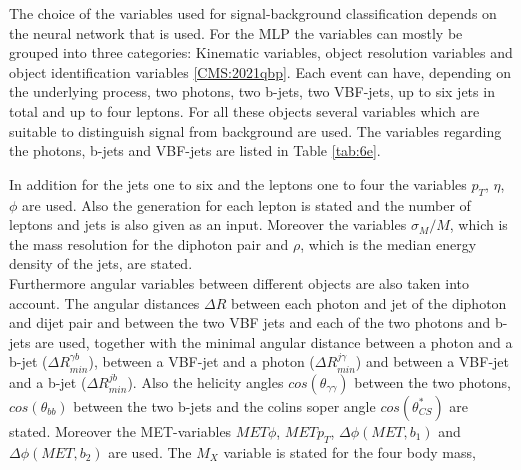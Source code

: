 The choice of the variables used for signal-background classification depends on the neural network that is used. For the MLP the variables can mostly be grouped into three
categories: Kinematic variables, object resolution variables and object identification variables \ref{CMS:2021qbp}. Each event can have, depending on the underlying process, two photons, two b-jets,
two VBF-jets, up to six jets in total and up to four leptons. For all these objects several variables which are suitable to distinguish signal from background are used.
The variables regarding the photons, b-jets and VBF-jets are listed in Table \ref{tab:6e}.


In addition for the jets one to six and the leptons one to four the variables $p_T$, $\eta$, $\phi$ are used. Also the generation for each lepton is stated and the number of leptons and jets is
also given as an input. Moreover the variables $\sigma_M/M$, which is the mass resolution for the diphoton pair and $\rho$, which is the median energy density of the jets, are stated. \\

Furthermore angular variables between different objects are also taken into account. The angular distances $\Delta R$ between each photon and jet of the diphoton and dijet pair 
and between the two VBF jets and each of the two photons and b-jets are used, together with the minimal angular distance between a photon and a b-jet ($\Delta R_{min}^{\gamma b}$), between a VBF-jet and a photon
($\Delta R_{min}^{j \gamma}$) and between a VBF-jet and a b-jet ($\Delta R_{min}^{j b}$).
Also the helicity angles $cos(\theta_{\gamma \gamma})$ between the two photons, $cos(\theta_{bb})$ between the two b-jets and the colins soper angle $cos(\theta_{CS}^*)$ are stated.
Moreover the MET-variables $MET \phi$, $MET p_T$, $\Delta \phi (MET, b_1)$ and $\Delta \phi (MET, b_2)$ are used. The $M_X$ variable is stated for the four body mass,

